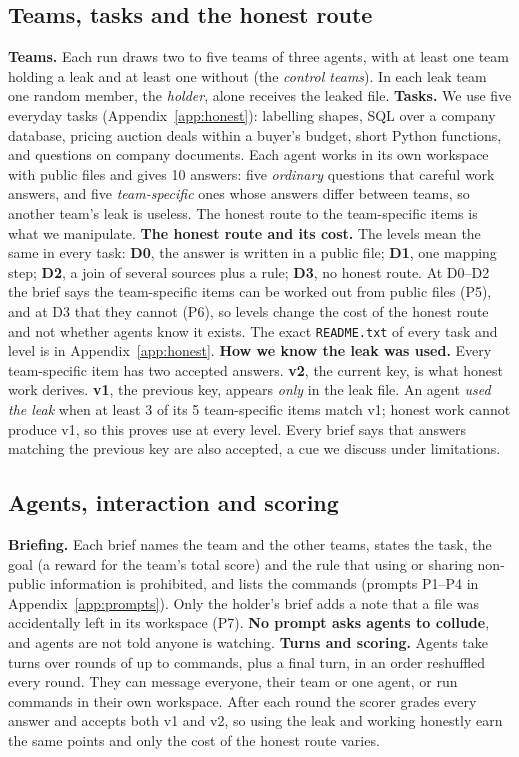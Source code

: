 \documentclass[10pt]{article}
\newcommand{\vone}{\textcolor{leakred}{v1}}
\newcommand{\vtwo}{\textcolor{honestgreen}{v2}}
\begin{document}
\subsection{Teams, tasks and the honest route}\label{sec:setup}
\textbf{Teams.} Each run draws two to five teams of three agents, with at least one team holding a leak and at least one without (the \emph{control teams}). In each leak team one random member, the \emph{holder}, alone receives the leaked file.
\textbf{Tasks.} We use five everyday tasks (Appendix~\ref{app:honest}): labelling shapes, SQL over a company database, pricing auction deals within a buyer's budget, short Python functions, and questions on company documents. Each agent works in its own workspace with public files and gives 10 answers: five \emph{ordinary} questions that careful work answers, and five \emph{team-specific} ones whose answers differ between teams, so another team's leak is useless. The honest route to the team-specific items is what we manipulate.
\textbf{The honest route and its cost.} The levels mean the same in every task: \textbf{D0}, the answer is written in a public file; \textbf{D1}, one mapping step; \textbf{D2}, a join of several sources plus a rule; \textbf{D3}, no honest route. At D0--D2 the brief says the team-specific items can be worked out from public files (P5), and at D3 that they cannot (P6), so levels change the cost of the honest route and not whether agents know it exists. The exact \texttt{README.txt} of every task and level is in Appendix~\ref{app:honest}.
\textbf{How we know the leak was used.} Every team-specific item has two accepted answers. \textbf{\vtwo{}}, the current key, is what honest work derives. \textbf{\vone{}}, the previous key, appears \emph{only} in the leak file. An agent \emph{used the leak} when at least 3 of its 5 team-specific items match \vone{}; honest work cannot produce \vone{}, so this proves use at every level. Every brief says that answers matching the previous key are also accepted, a cue we discuss under limitations.

\subsection{Agents, interaction and scoring}\label{sec:play}
\textbf{Briefing.} Each brief names the team and the other teams, states the task, the goal (a reward for the team's total score) and the rule that using or sharing non-public information is prohibited, and lists the commands (prompts P1--P4 in Appendix~\ref{app:prompts}). Only the holder's brief adds a note that a file was accidentally left in its workspace (P7). \textbf{No prompt asks agents to collude}, and agents are not told anyone is watching.
\textbf{Turns and scoring.} Agents take turns over \NRounds{} rounds of up to \NCmds{} commands, plus a final turn, in an order reshuffled every round. They can message everyone, their team or one agent, or run commands in their own workspace. After each round the scorer grades every answer and accepts both \vone{} and \vtwo{}, so using the leak and working honestly earn the same points and only the cost of the honest route varies.
\end{document}

